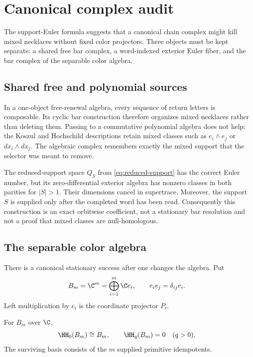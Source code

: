 \section{Canonical complex audit}
\label{sec:complexes}

The support-Euler formula suggests that a canonical chain complex might kill
mixed necklaces without fixed color projectors.  Three objects must be kept
separate: a shared free bar complex, a word-indexed exterior Euler fiber, and
the bar complex of the separable color algebra.

\subsection{Shared free and polynomial sources}

In a one-object free-renewal algebra, every sequence of return letters is
composable.  Its cyclic bar construction therefore organizes mixed necklaces
rather than deleting them.  Passing to a commutative polynomial algebra does
not help: the Koszul and Hochschild descriptions retain mixed classes such as
\(e_i\wedge e_j\) or \(dx_i\wedge dx_j\).  The algebraic complex remembers
exactly the mixed support that the selector was meant to remove.

The reduced-support space \(Q_S\) from \eqref{eq:reduced-support} has the
correct Euler number, but its zero-differential exterior algebra has nonzero
classes in both parities for \(|S|>1\).  Their dimensions cancel in
supertrace.  Moreover, the support \(S\) is supplied only after the completed
word has been read.  Consequently this construction is an exact orbitwise
coefficient, not a stationary bar resolution and not a proof that mixed
classes are null-homologous.

\subsection{The separable color algebra}

There is a canonical stationary success after one changes the algebra.  Put
\begin{equation}
 B_m=\C^m=\bigoplus_{i=1}^m\C e_i,
 \qquad e_ie_j=\delta_{ij}e_i.
 \label{eq:color-algebra}
\end{equation}
Left multiplication by \(e_i\) is the coordinate projector \(P_i\).

\begin{theorem}
\label{thm:hochschild-collapse}
For \(B_m\) over \(\C\),
\begin{equation}
 \HH_0(B_m)\cong B_m,
 \qquad
 \HH_q(B_m)=0\quad(q>0).
 \label{eq:hochschild-color}
\end{equation}
The surviving basis consists of the \(m\) supplied primitive idempotents.
\end{theorem}

